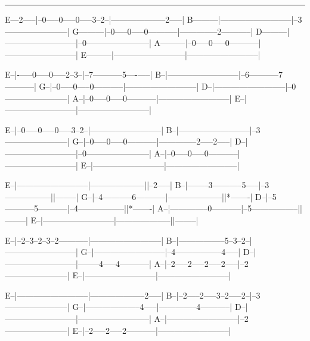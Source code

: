 \noindent\rule{\columnwidth}{1pt}

\begin{lsttab}
E---2-----|--0-----0-----0-----3--2--|--------------------2-----|
B---------|--------------------------|--3-----------------------|
G---------|--0-----0-----0-----------|--------------2-----------|
D---------|--------------------------|--0-----------------------|
A---------|--0-----0-----0-----------|--------------------------|
E---------|--------------------------|--------------------------|

E--|-\0-----0-----0-----2--3--|--7-----------5----\2-----|
B--|--------------------------|--6-----------7-----------|
G--|--0-----0-----0-----------|--------------------------|
D--|--------------------------|--0-----------------------|
A--|--0-----0-----0-----------|--------------------------|
E--|--------------------------|--------------------------|

E--|--0-----0-----0-----3--2--|--------------------------|
B--|--------------------------|--3-----------------------|
G--|--0-----0-----0-----------|--------------2-----2-----|
D--|--------------------------|--0-----------------------|
A--|--0-----0-----0-----------|--------------------------|
E--|--------------------------|--------------------------|

E--|--------------------------|--------------------||--2-----|
B--|--------3-----------5-----|--3-----------------||--------|
G--|--4-----------6-----------|--------------------||*-------|
D--|--5-----------5-----------|--4-----------------||*-------|
A--|--------------0-----------|--5-----------------||--------|
E--|--------------------------|--------------------||--------|

E--|--2--3--2--3--2-----------|--------------------------|
B--|-----------------5--3--2--|--------------------------|
G--|--------------------------|--4-----------------4-----|
D--|--------------------------|--------4-----4-----------|
A--|--2-----2-----2-----2-----|--2-----------------------|
E--|--------------------------|--------------------------|

E--|--------------------------|--------------------2-----|
B--|--2-----2-----3--2-----2--|--3-----------------------|
G--|--------------------4-----|--------------4-----------|
D--|--------------------------|--------------------------|
A--|--------------------------|--2-----------------------|
E--|--2-----2-----2-----------|--------------------------|


\end{lsttab}
